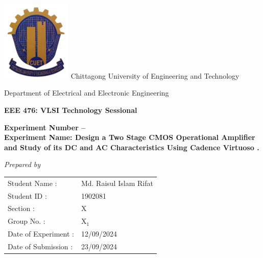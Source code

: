 \documentclass[11pt]{article}
\begin{document}
\begin{titlepage}
   \begin{center}
      \vspace*{3.5cm}
      \includegraphics[width=0.25\textwidth,center]{cuet}
      \vspace{1cm}
      \huge
      Chittagong University of Engineering and Technology

      \LARGE
      Department of Electrical and Electronic Engineering

      \vspace{1cm}
      \huge
      \textbf{EEE 476: VLSI Technology Sessional}

      \vspace{1cm}
      \LARGE
      \textbf{Experiment Number -- \\Experiment Name: Design a Two Stage CMOS Operational Amplifier and Study of its DC and AC
         Characteristics Using Cadence Virtuoso
         .}

      \vspace{1cm}
      \Large
      \textit{Prepared by}\\
      \vspace{0.5cm}
      \setlength{\tabcolsep}{0.001pt}
      \begin{tabularx}{\textwidth}{
            >{\raggedleft\arraybackslash}X
            >{\raggedright\arraybackslash}X}
         Student Name :       & \hspace{0.2cm}Md. Raisul Islam Rifat \\
         Student ID :         & \hspace{0.2cm}1902081                \\
         Section :            & \hspace{0.2cm}X                      \\
         Group No. :          & \hspace{0.2cm}$\text{X}_1$           \\
         Date of Experiment : & \hspace{0.2cm}12/09/2024             \\
         Date of Submission : & \hspace{0.2cm}23/09/2024             \\
      \end{tabularx}
   \end{center}
\end{titlepage}
\end{document}
